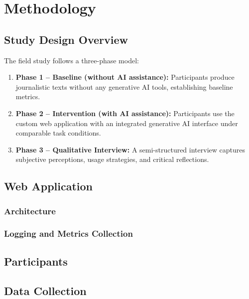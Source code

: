 \chapter{Methodology}
\label{ch:methodology}


\section{Study Design Overview}

The field study follows a three-phase model:

\begin{enumerate}
  \item \textbf{Phase 1 – Baseline (without AI assistance):} Participants
    produce journalistic texts without any generative AI tools, establishing
    baseline metrics.
  \item \textbf{Phase 2 – Intervention (with AI assistance):} Participants use
    the custom web application with an integrated generative AI interface under
    comparable task conditions.
  \item \textbf{Phase 3 – Qualitative Interview:} A semi-structured interview
    captures subjective perceptions, usage strategies, and critical reflections.
\end{enumerate}

\section{Web Application}

\subsection{Architecture}
\subsection{Logging and Metrics Collection}

\section{Participants}

\section{Data Collection}

